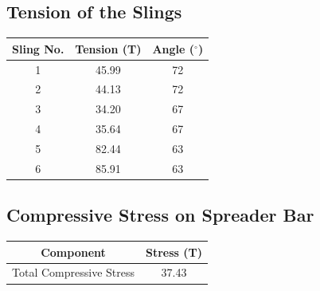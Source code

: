 \documentclass[12pt]{article}
\begin{document}
\subsection*{Tension of the Slings}
\begin{center}
\begin{tabular}{|c|c|c|}
\hline
Sling No. & Tension (T) & Angle ($^\circ$) \\
\hline
1 & 45.99 & 72 \\
2 & 44.13 & 72 \\
3 & 34.20 & 67 \\
4 & 35.64 & 67 \\
5 & 82.44 & 63 \\
6 & 85.91 & 63 \\
\hline
\end{tabular}
\end{center}

\subsection*{Compressive Stress on Spreader Bar}
\begin{center}
\begin{tabular}{|c|c|}
\hline
Component & Stress (T) \\
\hline
Total Compressive Stress & 37.43 \\
\hline
\end{tabular}
\end{center}
\end{document}
